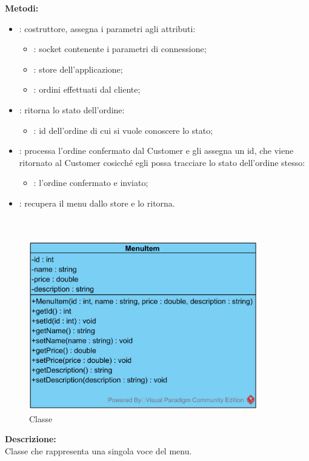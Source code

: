 \textbf{Metodi:}
\begin{itemize}
	\item {}: costruttore, assegna i parametri agli attributi:
	\begin{itemize}
		\item {}: socket contenente i parametri di connessione;
		\item {}: store dell'applicazione;
		\item {}: ordini effettuati dal cliente;
	\end{itemize}
	\item {}: ritorna lo stato dell'ordine:
	\begin{itemize}
		\item {}: id dell'ordine di cui si vuole conoscere lo stato;
	\end{itemize}
	\item {}: processa l'ordine confermato dal Customer e gli assegna un id, che viene ritornato al Customer cosicché egli possa tracciare lo stato dell'ordine stesso:
	\begin{itemize}
		\item {}: l'ordine confermato e inviato;
	\end{itemize}
	\item {}: recupera il menu dallo store e lo ritorna.
\end{itemize}

\paragraph[::MenuItem]{\class}\mbox{}\\ \label{\class}
\begin{figure}[H]
	\centering
	\includegraphics[width=10cm]{./diagrammi/demo/server/menuitem.png}
	\caption{Classe \class}
\end{figure}
\textbf{Descrizione:}\\
Classe che rappresenta una singola voce del menu.

